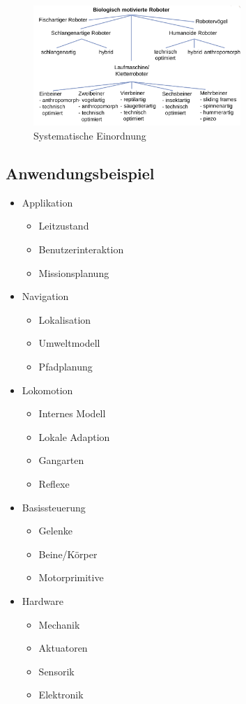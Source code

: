 \begin{figure}
	\centering
	\includegraphics[width=0.7\textwidth]{figures/einordnung.png}
	\caption{Systematische Einordnung}
\end{figure}

\subsection{Anwendungsbeispiel}
\begin{itemize}
	\item Applikation
	\begin{itemize}
		\item Leitzustand
		\item Benutzerinteraktion
		\item Missionsplanung
	\end{itemize}
	\item Navigation
	\begin{itemize}
		\item Lokalisation
		\item Umweltmodell
		\item Pfadplanung
	\end{itemize}
	\item Lokomotion
	\begin{itemize}
		\item Internes Modell
		\item Lokale Adaption
		\item Gangarten
		\item Reflexe
	\end{itemize}
	\item Basissteuerung
	\begin{itemize}
		\item Gelenke
		\item Beine/Körper
		\item Motorprimitive
	\end{itemize}
	\item Hardware
	\begin{itemize}
		\item Mechanik
		\item Aktuatoren
		\item Sensorik
		\item Elektronik
	\end{itemize}
\end{itemize}

